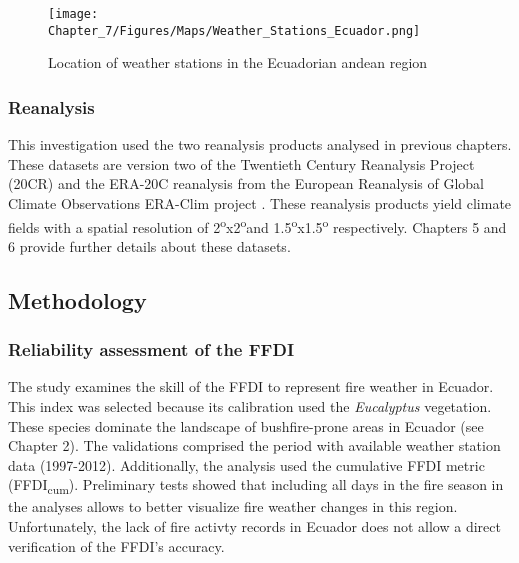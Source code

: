 \begin{figure}[h]
\noindent \begin{centering}
\texttt{[image: Chapter\_7/Figures/Maps/Weather\_Stations\_Ecuador.png]}
\par\end{centering}

\caption[Location of weather stations in the Ecuadorian andean region]{Location of weather stations in the Ecuadorian andean region \label{fig:Location of weather stations in the Ecuadorian andean region}}
\end{figure}



\subsubsection{Reanalysis}

This investigation used the two reanalysis products analysed in previous
chapters. These datasets are version two of the Twentieth Century
Reanalysis Project (20CR) \citep{Compo2011} and the ERA-20C reanalysis
from the European Reanalysis of Global Climate Observations ERA-Clim
project \citep*{Stickler2014,Stickler2014a}. These reanalysis products
yield climate fields with a spatial resolution of 2\textsuperscript{o}x2\textsuperscript{o}and
1.5\textsuperscript{o}x1.5\textsuperscript{o} respectively. Chapters
5 and 6 provide further details about these datasets. 


\subsection{Methodology}


\subsubsection{Reliability assessment of the FFDI}

The study examines the skill of the FFDI to represent fire weather
in Ecuador. This index was selected because its calibration used the
\textit{Eucalyptus} vegetation. These species dominate the landscape
of bushfire-prone areas in Ecuador (see Chapter 2). The validations
comprised the period with available weather station data (1997-2012).
Additionally, the analysis used the cumulative FFDI metric (FFDI\textsubscript{cum}).
Preliminary tests showed that including all days in the fire season
in the analyses allows to better visualize fire weather changes in
this region. Unfortunately, the lack of fire activty records in Ecuador
does not allow a direct verification of the FFDI's accuracy. 


